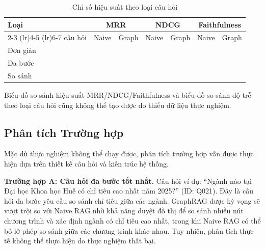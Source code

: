 \begin{table}[htbp]
\centering
\caption{Chỉ số hiệu suất theo loại câu hỏi}
\label{tab:metrics_by_category}
\begin{tabular}{lcccccc}
\toprule
Loại & \multicolumn{2}{c}{MRR} & \multicolumn{2}{c}{NDCG} & \multicolumn{2}{c}{Faithfulness} \\
\cmidrule(lr){2-3} \cmidrule(lr){4-5} \cmidrule(lr){6-7}
câu hỏi & Naive & Graph & Naive & Graph & Naive & Graph \\
\midrule
Đơn giản & %
 & %
 & %
 & %
 & %
 & %
 \\
Đa bước & %
 & %
 & %
 & %
 & %
 & %
 \\
So sánh & %
 & %
 & %
 & %
 & %
 & %
 \\
\bottomrule
\end{tabular}
\end{table}

Biểu đồ so sánh hiệu suất MRR/NDCG/Faithfulness và biểu đồ so sánh độ trễ theo loại câu hỏi cũng không thể tạo được do thiếu dữ liệu thực nghiệm.


\subsection{Phân tích Trường hợp}
Mặc dù thực nghiệm không thể chạy được, phân tích trường hợp vẫn được thực hiện dựa trên thiết kế câu hỏi và kiến trúc hệ thống.

\textbf{Trường hợp A: Câu hỏi đa bước tốt nhất.} Câu hỏi ví dụ: ``Ngành nào tại Đại học Khoa học Huế có chỉ tiêu cao nhất năm 2025?'' (ID: Q021). Đây là câu hỏi đa bước yêu cầu so sánh chỉ tiêu giữa các ngành. GraphRAG được kỳ vọng sẽ vượt trội so với Naive RAG nhờ khả năng duyệt đồ thị để so sánh nhiều nút chương trình và xác định ngành có chỉ tiêu cao nhất, trong khi Naive RAG có thể bỏ lỡ phép so sánh giữa các chương trình khác nhau. Tuy nhiên, phân tích thực tế không thể thực hiện do thực nghiệm thất bại.

